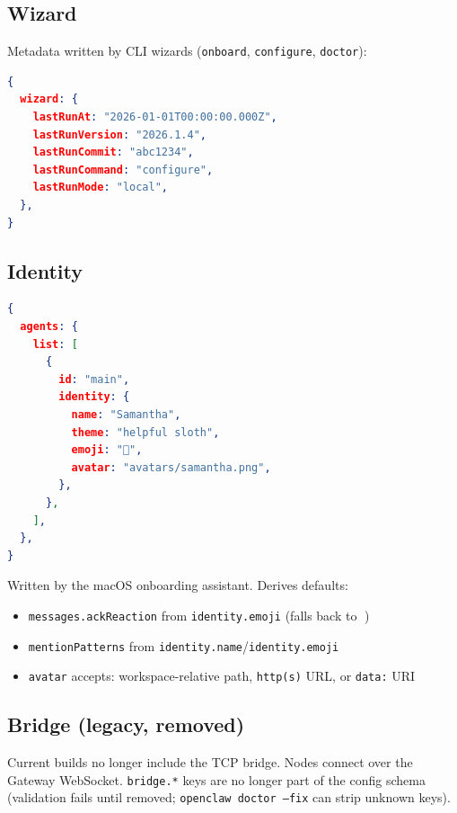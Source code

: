 \hrulefill


\subsection{Wizard}


Metadata written by CLI wizards (\texttt{onboard}, \texttt{configure}, \texttt{doctor}):

\begin{lstlisting}[language=json]
{
  wizard: {
    lastRunAt: "2026-01-01T00:00:00.000Z",
    lastRunVersion: "2026.1.4",
    lastRunCommit: "abc1234",
    lastRunCommand: "configure",
    lastRunMode: "local",
  },
}
\end{lstlisting}


\hrulefill


\subsection{Identity}


\begin{lstlisting}[language=json]
{
  agents: {
    list: [
      {
        id: "main",
        identity: {
          name: "Samantha",
          theme: "helpful sloth",
          emoji: "🦥",
          avatar: "avatars/samantha.png",
        },
      },
    ],
  },
}
\end{lstlisting}


Written by the macOS onboarding assistant. Derives defaults:

\begin{itemize}
  \item \texttt{messages.ackReaction} from \texttt{identity.emoji} (falls back to 👀)
  \item \texttt{mentionPatterns} from \texttt{identity.name}/\texttt{identity.emoji}
  \item \texttt{avatar} accepts: workspace-relative path, \texttt{http(s)} URL, or \texttt{data:} URI
\end{itemize}


\hrulefill


\subsection{Bridge (legacy, removed)}


Current builds no longer include the TCP bridge. Nodes connect over the Gateway WebSocket. \texttt{bridge.*} keys are no longer part of the config schema (validation fails until removed; \texttt{openclaw doctor --fix} can strip unknown keys).


